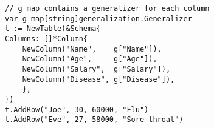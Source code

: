 \begin{lstlisting}[caption=Input data table declaration,label=lst:example_input_table,float,floatplacement=H]
// g map contains a generalizer for each column
var g map[string]generalization.Generalizer
t := NewTable(&Schema{
Columns: []*Column{
    NewColumn("Name",    g["Name"]),
    NewColumn("Age",     g["Age"]),
    NewColumn("Salary",  g["Salary"]),
    NewColumn("Disease", g["Disease"]),
    },
})
t.AddRow("Joe", 30, 60000, "Flu")
t.AddRow("Eve", 27, 58000, "Sore throat")
\end{lstlisting}